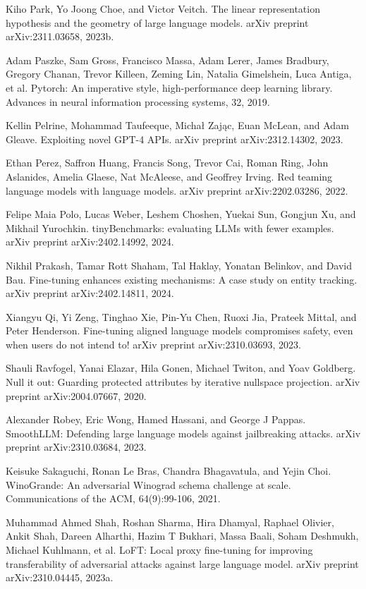 \documentclass[10pt]{article}
\begin{document}
Kiho Park, Yo Joong Choe, and Victor Veitch. The linear representation hypothesis and the geometry of large language models. arXiv preprint arXiv:2311.03658, 2023b.

Adam Paszke, Sam Gross, Francisco Massa, Adam Lerer, James Bradbury, Gregory Chanan, Trevor Killeen, Zeming Lin, Natalia Gimelshein, Luca Antiga, et al. Pytorch: An imperative style, high-performance deep learning library. Advances in neural information processing systems, 32, 2019.

Kellin Pelrine, Mohammad Taufeeque, Michał Zając, Euan McLean, and Adam Gleave. Exploiting novel GPT-4 APIs. arXiv preprint arXiv:2312.14302, 2023.

Ethan Perez, Saffron Huang, Francis Song, Trevor Cai, Roman Ring, John Aslanides, Amelia Glaese, Nat McAleese, and Geoffrey Irving. Red teaming language models with language models. arXiv preprint arXiv:2202.03286, 2022.

Felipe Maia Polo, Lucas Weber, Leshem Choshen, Yuekai Sun, Gongjun Xu, and Mikhail Yurochkin. tinyBenchmarks: evaluating LLMs with fewer examples. arXiv preprint arXiv:2402.14992, 2024.

Nikhil Prakash, Tamar Rott Shaham, Tal Haklay, Yonatan Belinkov, and David Bau. Fine-tuning enhances existing mechanisms: A case study on entity tracking. arXiv preprint arXiv:2402.14811, 2024.

Xiangyu Qi, Yi Zeng, Tinghao Xie, Pin-Yu Chen, Ruoxi Jia, Prateek Mittal, and Peter Henderson. Fine-tuning aligned language models compromises safety, even when users do not intend to! arXiv preprint arXiv:2310.03693, 2023.

Shauli Ravfogel, Yanai Elazar, Hila Gonen, Michael Twiton, and Yoav Goldberg. Null it out: Guarding protected attributes by iterative nullspace projection. arXiv preprint arXiv:2004.07667, 2020.

Alexander Robey, Eric Wong, Hamed Hassani, and George J Pappas. SmoothLLM: Defending large language models against jailbreaking attacks. arXiv preprint arXiv:2310.03684, 2023.

Keisuke Sakaguchi, Ronan Le Bras, Chandra Bhagavatula, and Yejin Choi. WinoGrande: An adversarial Winograd schema challenge at scale. Communications of the ACM, 64(9):99-106, 2021.

Muhammad Ahmed Shah, Roshan Sharma, Hira Dhamyal, Raphael Olivier, Ankit Shah, Dareen Alharthi, Hazim T Bukhari, Massa Baali, Soham Deshmukh, Michael Kuhlmann, et al. LoFT: Local proxy fine-tuning for improving transferability of adversarial attacks against large language model. arXiv preprint arXiv:2310.04445, 2023a.
\end{document}
